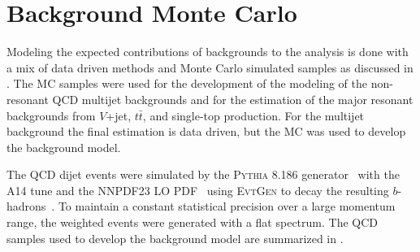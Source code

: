 \section{Background Monte Carlo} \label{sec:data:bkg_mc}

Modeling the expected contributions of backgrounds to the analysis is done with
a mix of data driven methods and Monte Carlo simulated samples as discussed in
.  The MC samples were used for the development of the
modeling of the non-resonant QCD multijet backgrounds and for the estimation
of the major resonant backgrounds from $V$+jet, $t\bar{t}$, and single-top
production.  For the multijet background the final estimation is data driven,
but the MC was used to develop the background model.

The QCD dijet events were simulated by the \textsc{Pythia} 8.186
generator~\cite{Sjostrand:2007gs} with the A14 tune and the NNPDF23 LO
PDF~\cite{Carrazza:2013axa} using \textsc{EvtGen} to decay the resulting
$b$-hadrons~\cite{LANGE2001152}.  To maintain a constant statistical precision
over a large momentum range, the weighted events were generated with a flat \pT
spectrum. The QCD samples used to develop the background model are summarized
in .

